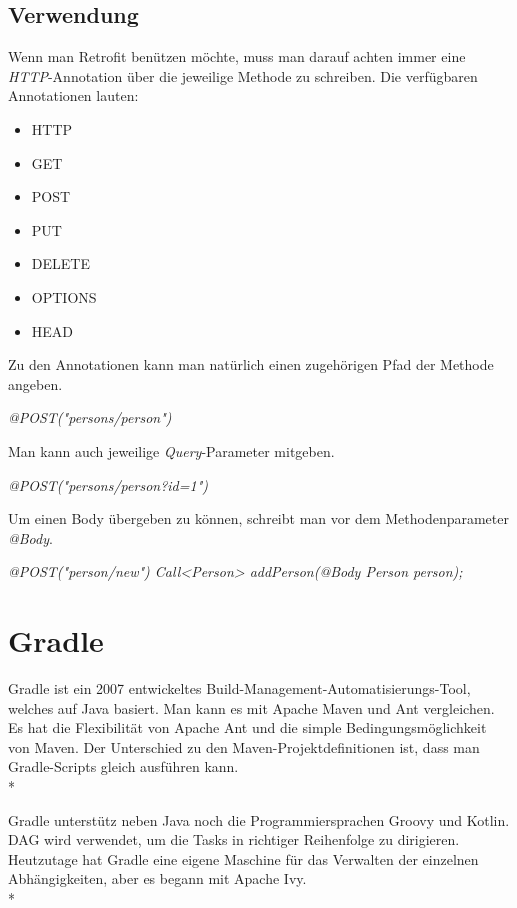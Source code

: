 \subsection{Verwendung}
Wenn man Retrofit benützen möchte, muss man darauf achten immer eine \textit{HTTP}-Annotation über die jeweilige Methode
zu schreiben. Die verfügbaren Annotationen lauten:

\begin{itemize}
    \item HTTP
    \item GET
    \item POST
    \item PUT
    \item DELETE
    \item OPTIONS
    \item HEAD
\end{itemize}


Zu den Annotationen kann man natürlich einen zugehörigen Pfad der Methode angeben.

\textit{@POST("persons/person")}

Man kann auch jeweilige \textit{Query}-Parameter mitgeben.

\textit{@POST("persons/person?id=1")}

Um einen Body übergeben zu können, schreibt man vor dem Methodenparameter \textit{@Body}.

\textit{
@POST("person/new")
Call<Person> addPerson(@Body Person person);
}



\section{Gradle}
\cite{Gradle1}
\cite{Gradle2}
\author{Bozidar Spasenovic}
Gradle ist ein 2007 entwickeltes Build-Management-Automatisierungs-Tool, welches auf Java basiert.
Man kann es mit Apache Maven und Ant vergleichen.
Es hat die Flexibilität von Apache Ant und die simple Bedingungsmöglichkeit von Maven.
Der Unterschied zu den  Maven-Projektdefinitionen ist, dass man Gradle-Scripts gleich ausführen kann.
 \\*
    
Gradle unterstütz neben Java noch die Programmiersprachen Groovy und Kotlin.
DAG wird verwendet, um die Tasks in richtiger Reihenfolge zu dirigieren.
Heutzutage hat Gradle eine eigene Maschine für das Verwalten der einzelnen Abhängigkeiten, aber es begann mit Apache Ivy.
\\*


